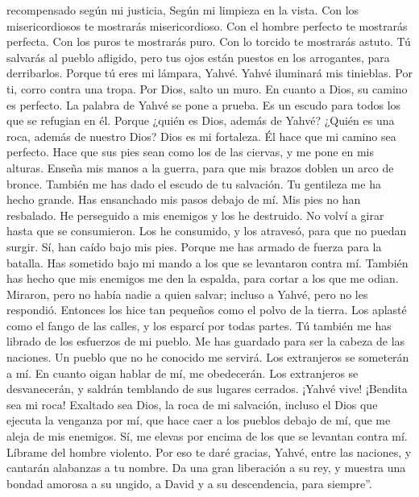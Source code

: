 \begin{paracol}{2}
recompensado según mi justicia, Según mi limpieza en la vista.
 Con los misericordiosos te mostrarás misericordioso. Con
el hombre perfecto te mostrarás perfecta.  Con los puros
te mostrarás puro. Con lo torcido te mostrarás astuto. 
Tú salvarás al pueblo afligido, pero tus ojos están puestos en los
arrogantes, para derribarlos.  Porque tú eres mi lámpara,
Yahvé. Yahvé iluminará mis tinieblas.  Por ti, corro
contra una tropa. Por Dios, salto un muro.  En cuanto a
Dios, su camino es perfecto. La palabra de Yahvé se pone a prueba. Es un
escudo para todos los que se refugian en él.  Porque
¿quién es Dios, además de Yahvé? ¿Quién es una roca, además de nuestro
Dios?  Dios es mi fortaleza. Él hace que mi camino sea
perfecto.  Hace que sus pies sean como los de las
ciervas, y me pone en mis alturas.  Enseña mis manos a la
guerra, para que mis brazos doblen un arco de bronce. 
También me has dado el escudo de tu salvación. Tu gentileza me ha hecho
grande.  Has ensanchado mis pasos debajo de mí. Mis pies
no han resbalado.  He perseguido a mis enemigos y los he
destruido. No volví a girar hasta que se consumieron. 
Los he consumido, y los atravesó, para que no puedan surgir. Sí, han
caído bajo mis pies.  Porque me has armado de fuerza para
la batalla. Has sometido bajo mi mando a los que se levantaron contra
mí.  También has hecho que mis enemigos me den la
espalda, para cortar a los que me odian.  Miraron, pero
no había nadie a quien salvar; incluso a Yahvé, pero no les respondió.
 Entonces los hice tan pequeños como el polvo de la
tierra. Los aplasté como el fango de las calles, y los esparcí por todas
partes.  Tú también me has librado de los esfuerzos de mi
pueblo. Me has guardado para ser la cabeza de las naciones. Un pueblo
que no he conocido me servirá.  Los extranjeros se
someterán a mí. En cuanto oigan hablar de mí, me obedecerán.
 Los extranjeros se desvanecerán, y saldrán temblando de
sus lugares cerrados.  ¡Yahvé vive! ¡Bendita sea mi roca!
Exaltado sea Dios, la roca de mi salvación,  incluso el
Dios que ejecuta la venganza por mí, que hace caer a los pueblos debajo
de mí,  que me aleja de mis enemigos. Sí, me elevas por
encima de los que se levantan contra mí. Líbrame del hombre violento.
 Por eso te daré gracias, Yahvé, entre las naciones, y
cantarán alabanzas a tu nombre.  Da una gran liberación a
su rey, y muestra una bondad amorosa a su ungido, a David y a su
descendencia, para siempre''.


\end{paracol}
